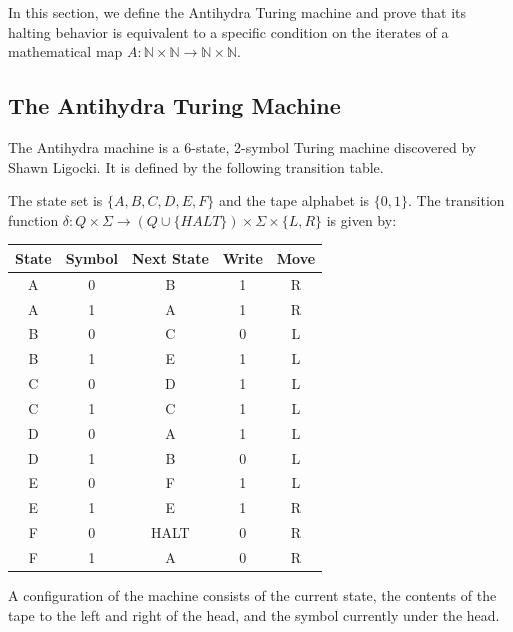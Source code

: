 \label{sec:antihydra}

In this section, we define the Antihydra Turing machine and prove that its halting behavior is equivalent to a specific condition on the iterates of a mathematical map $A: \mathbb{N} \times \mathbb{N} \to \mathbb{N} \times \mathbb{N}$.

\subsection{The Antihydra Turing Machine}

The Antihydra machine is a 6-state, 2-symbol Turing machine discovered by Shawn Ligocki. It is defined by the following transition table.

\begin{definition}
  \label{def:transition}
  \leanok
  The state set is $\{A, B, C, D, E, F\}$ and the tape alphabet is $\{0, 1\}$. The transition function $\delta: Q \times \Sigma \to (Q \cup \{HALT\}) \times \Sigma \times \{L, R\}$ is given by:
  \begin{center}
  \begin{tabular}{|c|c||c|c|c|}
    \hline
    State & Symbol & Next State & Write & Move \\
    \hline
    A & 0 & B & 1 & R \\
    A & 1 & A & 1 & R \\
    B & 0 & C & 0 & L \\
    B & 1 & E & 1 & L \\
    C & 0 & D & 1 & L \\
    C & 1 & C & 1 & L \\
    D & 0 & A & 1 & L \\
    D & 1 & B & 0 & L \\
    E & 0 & F & 1 & L \\
    E & 1 & E & 1 & R \\
    F & 0 & HALT & 0 & R \\
    F & 1 & A & 0 & R \\
    \hline
  \end{tabular}
  \end{center}
\end{definition}

\begin{definition}
  \label{def:Config}
  \leanok
  A configuration of the machine consists of the current state, the contents of the tape to the left and right of the head, and the symbol currently under the head.
\end{definition}

